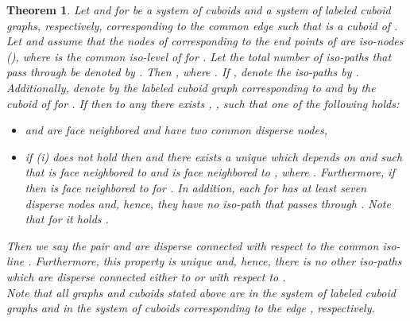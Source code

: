 \documentclass[a4paper,11pt]{article}
\newtheorem{theorem}{Theorem}[section]
\begin{document}
\begin{theorem}
Let  and  for  be a system of cuboids and a system of
labeled cuboid graphs, respectively, corresponding to the common edge  such that  is a
cuboid of . Let  and assume that the nodes of  corresponding to
the end points of  are iso-nodes (), where 
is the common iso-level of  for . Let the total number of iso-paths
that pass through  be denoted by . Then , where
. If , denote the iso-paths by . Additionally,
denote by  the labeled cuboid graph corresponding to  and by 
the cuboid of  for . If  then to any  there exists ,
, such that one of the following holds:
\begin{itemize}
\item[(i)]  and  are face neighbored and have two common
disperse nodes,
\item[(ii)] if (i) does not hold then  and there exists a unique  which
depends on  and  such that  is face neighbored to  and
 is face neighbored to , where . Furthermore, if  then  is face neighbored to 
for . In addition, each  for  has at least seven disperse
nodes and, hence, they have no iso-path that passes through . Note that for  it holds
.
\end{itemize}
Then we say the pair  and  are disperse connected with respect to the common
iso-line . Furthermore, this property is unique and, hence, there is no other iso-paths which
are disperse connected either to  or  with respect to .\\

\noindent Note that all graphs and cuboids stated above are in the system of labeled cuboid
graphs and in the system of cuboids corresponding to the edge , respectively.
\label{thm:connect-3}
\end{theorem}
\end{document}
